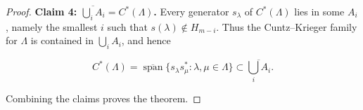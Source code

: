 \documentclass[10pt,a4paper]{amsart}
\begin{document}
\begin{proof}
\smallskip

\textbf{Claim 4: $\overline{\bigcup_i A_i} = C^*(\Lambda)$.}
Every generator $s_\lambda$ of $C^*(\Lambda)$ lies in some
$A_i$, namely the smallest $i$ such that $s(\lambda)\notin H_{m-i}$.
Thus the Cuntz--Krieger family for $\Lambda$ is contained in
$\bigcup_i A_i$, and hence


\[
C^*(\Lambda) = \overline{\operatorname{span}}
\{ s_\lambda s_\mu^* : \lambda,\mu\in\Lambda\}
\subset \overline{\bigcup_i A_i}.
\]



\smallskip

Combining the claims proves the theorem.
\end{proof}
\end{document}

